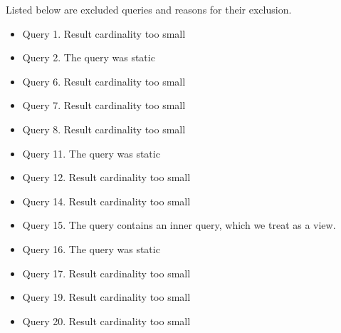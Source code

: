 Listed below are excluded queries and reasons for their exclusion.
\begin{itemize}
\item Query 1. Result cardinality too small
\item Query 2. The query was static
\item Query 6. Result cardinality too small
\item Query 7. Result cardinality too small
\item Query 8. Result cardinality too small
\item Query 11. The query was static 
\item Query 12. Result cardinality too small
\item Query 14. Result cardinality too small
\item Query 15. The query contains an inner query, which we treat as a view.
\item Query 16. The query was static 
\item Query 17. Result cardinality too small
\item Query 19. Result cardinality too small
\item Query 20. Result cardinality too small
\end{itemize}


